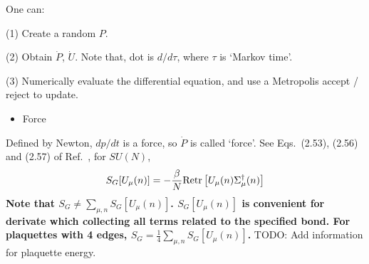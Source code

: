 One can:

(1) Create a random $P$.

(2) Obtain $\dot{P}$, $\dot{U}$. Note that, dot is $d/d\tau$, where $\tau$ is `Markov time'.

(3) Numerically evaluate the differential equation, and use a Metropolis accept / reject to update.

\begin{itemize}
\item {}Force
\end{itemize}

Defined by Newton, $dp/dt$ is a force, so $\dot{P}$ is called `force'. See Eqs.~(2.53), (2.56) and (2.57) of Ref.~\cite{latticeqcdbook2017}, for $SU(N)$,
\begin{equation}
\begin{split}
&S_G[U_{\mu}(n)]=-\frac{\beta}{N}{\rm Re}{\rm tr}\left[U_{\mu}(n)\Sigma ^{\dagger}_{\mu}(n)\right]\\
\end{split}
\label{eq.hmc.staple}
\end{equation}
\textbf{Note that $S_G\neq \sum _{\mu,n} S_G[U_{\mu}(n)]$. $S_G[U_{\mu}(n)]$ is convenient for derivate which collecting all terms related to the specified bond. For plaquettes with 4 edges, $S_G=\frac{1}{4} \sum _{\mu,n} S_G[U_{\mu}(n)]$. } \textcolor[rgb]{0,0,1}{TODO: Add information for plaquette energy.}

